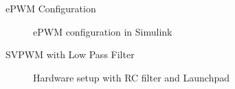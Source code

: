 \begin{frame}{ePWM Configuration}
	\begin{figure}
		\centering
		\caption{ePWM configuration in Simulink}
	\end{figure}
\end{frame}
\begin{frame}{SVPWM with Low Pass Filter}
	\begin{figure}
		\centering


		\caption{Hardware setup with RC filter and Launchpad}
	\end{figure}
\end{frame}


